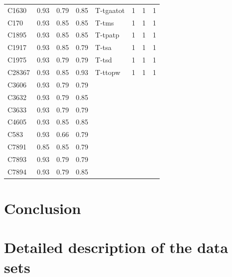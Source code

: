 \documentclass[a4paper,10pt,twoside,fleqn]{article}
\begin{document}
\begin{table}[h!]
\begin{tabular}{lrrrlrrr}
C1630    & 0.93 & 0.79 & 0.85 &  T-tgaatot    &    1    &    1    &    1   \\
C170     & 0.93 & 0.85 & 0.85 &      T-tms    &    1    &    1    &    1   \\
C1895    & 0.93 & 0.85 & 0.85 &    T-tpatp    &    1    &    1    &    1   \\
C1917    & 0.93 & 0.85 & 0.79 &      T-tsa    &    1    &    1    &    1   \\
C1975    & 0.93 & 0.79 & 0.79 &      T-tsd    &    1    &    1    &    1   \\
C28367   & 0.93 & 0.85 & 0.93 &    T-ttopw    &    1    &    1    &    1   \\
C3606    & 0.93 & 0.79 & 0.79 &             &         &         & 		\\
C3632    & 0.93 & 0.79 & 0.85 &             &         &         & 		\\
C3633    & 0.93 & 0.79 & 0.79 &             &         &         & 		\\
C4605    & 0.93 & 0.85 & 0.85 &             &         &         & 		\\
C583     & 0.93 & 0.66 & 0.79 &             &         &         & 		\\
C7891    & 0.85 & 0.85 & 0.79 &             &         &         & 		\\
C7893    & 0.93 & 0.79 & 0.79 &             &         &         & 		\\
C7894    & 0.93 & 0.79 & 0.85 &             &         &         & 		\\
\bottomrule
\end{tabular}
\end{table}




\section{Conclusion}\label{sec:conclusion}








\appendix

\section{Detailed description of the data sets}
\end{document}
